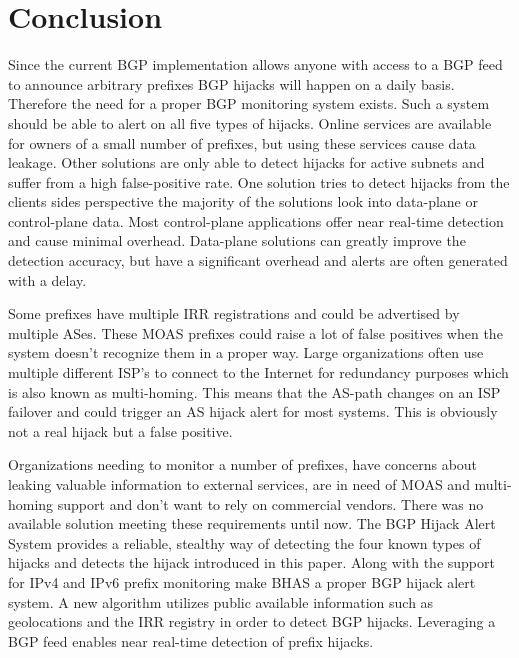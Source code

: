 \chapter{Conclusion}\label{ch:conclusion}
Since the current BGP implementation allows anyone with access to a BGP feed to announce arbitrary prefixes BGP hijacks will happen on a daily basis. Therefore the need for a proper BGP monitoring system exists. Such a system should be able to alert on all five types of hijacks. Online services are available for owners of a small number of prefixes, but using these services cause data leakage. Other solutions are only able to detect hijacks for active subnets and suffer from a high false-positive rate. One solution tries to detect hijacks from the clients sides perspective the majority of the solutions look into data-plane or control-plane data. Most control-plane applications offer near real-time detection and cause minimal overhead. Data-plane solutions can greatly improve the detection accuracy, but have a significant overhead and alerts are often generated with a delay.\par

Some prefixes have multiple IRR registrations and could be advertised by multiple ASes. These MOAS prefixes could raise a lot of false positives when the system doesn't recognize them in a proper way. Large organizations often use multiple different ISP's to connect to the Internet for redundancy purposes which is also known as multi-homing. This means that the AS-path changes on an ISP failover and could trigger an AS hijack alert for most systems. This is obviously not a real hijack but a false positive.\par

Organizations needing to monitor a number of prefixes, have concerns about leaking valuable information to external services, are in need of MOAS and multi-homing support and don't want to rely on commercial vendors. There was no available solution meeting these requirements until now. The BGP Hijack Alert System provides a reliable, stealthy way of detecting the four known types of hijacks and detects the hijack introduced in this paper. Along with the support for IPv4 and IPv6 prefix monitoring make BHAS a proper BGP hijack alert system. A new algorithm utilizes public available information such as geolocations and the IRR registry in order to detect BGP hijacks. Leveraging a BGP feed enables near real-time detection of prefix hijacks.

